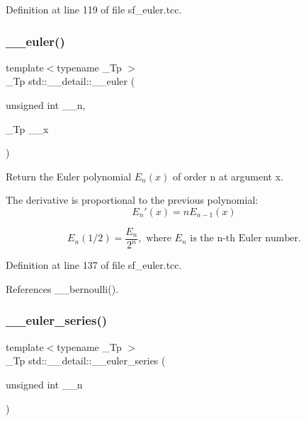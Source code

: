 Definition at line 119 of file sf\+\_\+euler.\+tcc.

\mbox{\label{namespacestd_1_1____detail_aa44d18f565c3c36ba0351374dc4af09d}} 
\subsubsection{\texorpdfstring{\+\_\+\+\_\+euler()}{\_\_euler()}\hspace{0.1cm}{\footnotesize\ttfamily [2/2]}}
{\footnotesize\ttfamily template$<$typename \+\_\+\+Tp $>$ \\
\+\_\+\+Tp std\+::\+\_\+\+\_\+detail\+::\+\_\+\+\_\+euler (\begin{DoxyParamCaption}\item[{unsigned int}]{\+\_\+\+\_\+n,  }\item[{\+\_\+\+Tp}]{\+\_\+\+\_\+x }\end{DoxyParamCaption})}

Return the Euler polynomial $ E_n(x) $ of order n at argument x.

The derivative is proportional to the previous polynomial\+: \[ E_n'(x) = n E_{n-1}(x) \]

\[ E_n(1/2) = \frac{E_n}{2^n}, \mbox{ where } E_n \mbox{ is the n-th Euler number.} \] 

Definition at line 137 of file sf\+\_\+euler.\+tcc.



References \+\_\+\+\_\+bernoulli().

\mbox{\label{namespacestd_1_1____detail_a2e3eb67dee4d0b5c96824a4e8e9c227e}} 
\subsubsection{\texorpdfstring{\+\_\+\+\_\+euler\+\_\+series()}{\_\_euler\_series()}}
{\footnotesize\ttfamily template$<$typename \+\_\+\+Tp $>$ \\
\+\_\+\+Tp std\+::\+\_\+\+\_\+detail\+::\+\_\+\+\_\+euler\+\_\+series (\begin{DoxyParamCaption}\item[{unsigned int}]{\+\_\+\+\_\+n }\end{DoxyParamCaption})}

